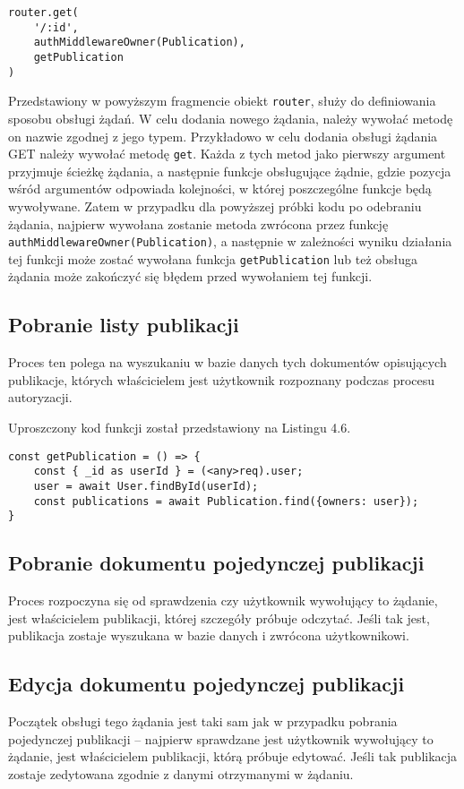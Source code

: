 \documentclass[a4paper,12pt,twoside,openany]{report}
\begin{document}
\begin{lstlisting}[caption=Deklaracja obsługi żądania,label=code1,captionpos=b]
router.get(
	'/:id', 
	authMiddlewareOwner(Publication), 
	getPublication
)
\end{lstlisting}
Przedstawiony w powyższym fragmencie obiekt \verb|router|, służy do definiowania sposobu obsługi żądań. W celu dodania nowego żądania, należy wywołać metodę on nazwie zgodnej z jego typem. Przykładowo w celu dodania obsługi żądania GET należy wywołać metodę \verb|get|. Każda z tych metod jako pierwszy argument przyjmuje ścieżkę żądania, a następnie funkcje obsługujące żądnie, gdzie pozycja wśród argumentów odpowiada kolejności, w której poszczególne funkcje będą wywoływane. Zatem w przypadku dla powyższej próbki kodu po odebraniu żądania, najpierw wywołana zostanie metoda zwrócona przez funkcję \verb|authMiddlewareOwner(Publication)|, a następnie w zależności wyniku działania tej funkcji może zostać wywołana funkcja \verb|getPublication| lub też obsługa żądania może zakończyć się błędem przed wywołaniem tej funkcji.


\subsection{Pobranie listy publikacji}
Proces ten polega na wyszukaniu w bazie danych tych dokumentów opisujących publikacje, których właścicielem jest użytkownik rozpoznany podczas procesu autoryzacji.
\pagebreak

Uproszczony kod funkcji został przedstawiony na Listingu 4.6.
\begin{lstlisting}[caption=Funkcja getPublication,label=code1,captionpos=b]
const getPublication = () => {
	const { _id as userId } = (<any>req).user;
	user = await User.findById(userId);
	const publications = await Publication.find({owners: user});
}
\end{lstlisting}
\subsection{Pobranie dokumentu pojedynczej publikacji}
Proces rozpoczyna się od sprawdzenia czy użytkownik wywołujący to żądanie, jest właścicielem publikacji, której szczegóły próbuje odczytać. Jeśli tak jest, publikacja zostaje wyszukana w bazie danych i zwrócona użytkownikowi.

\subsection{Edycja dokumentu pojedynczej publikacji}
Początek obsługi tego żądania jest taki sam jak w przypadku pobrania pojedynczej publikacji -- najpierw sprawdzane jest użytkownik wywołujący to żądanie, jest właścicielem publikacji, którą próbuje edytować. Jeśli tak publikacja zostaje zedytowana zgodnie z danymi otrzymanymi w żądaniu.
\end{document}
